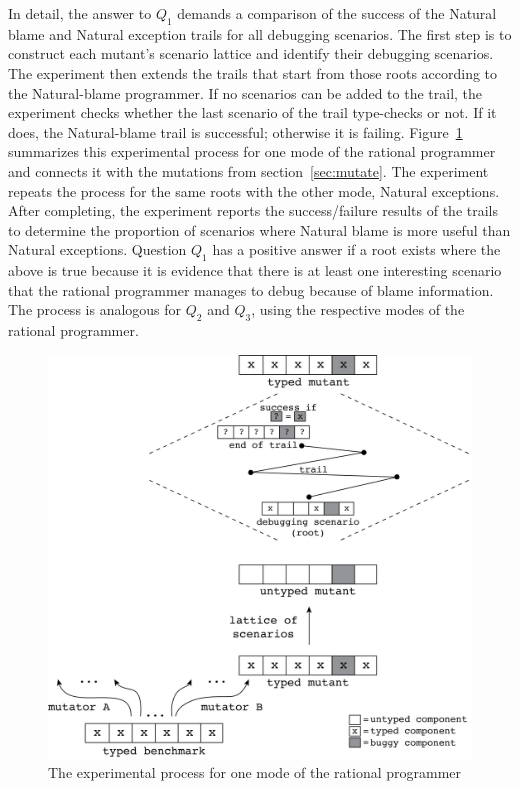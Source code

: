 
In detail, the answer to $Q_1$ demands a comparison of the success of the Natural
blame and Natural exception trails for all debugging scenarios.  The
first step is to construct each mutant's scenario lattice and identify their
debugging scenarios.  The experiment then extends the trails that start
from those roots according to the Natural-blame programmer.  If no scenarios can
be added to the trail, the experiment checks whether the last scenario
of the trail type-checks or not. If it does, the
Natural-blame trail is successful; otherwise it is failing. 
Figure~\ref{fig:process} summarizes this experimental process for
one mode of the rational programmer and connects it with the mutations from
section~\ref{sec:mutate}.
The experiment repeats the process for the same roots with the other mode, Natural
exceptions.
After completing, the experiment
reports the success/failure results of the trails to determine the proportion of
scenarios where Natural blame is more useful than Natural exceptions.  Question
$Q_1$ has a positive answer if a root exists where the above is true because it
is evidence that there is at least one interesting scenario that the rational
programmer manages to debug because of blame information.  The process is analogous
for $Q_2$ and $Q_3$, using the respective modes of the rational programmer.

\begin{figure}[bh]
  \centering
  \includegraphics[scale=0.36]{./Images/process}
  \caption{The experimental process for one mode of the rational
  programmer}
  \label{fig:process}
\end{figure}


